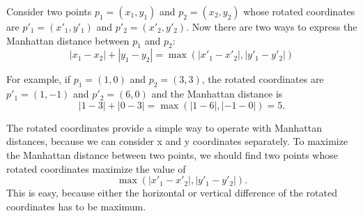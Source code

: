 Consider two points $p_1=(x_1,y_1)$ and $p_2=(x_2,y_2)$ whose rotated
coordinates are $p'_1=(x'_1,y'_1)$ and $p'_2=(x'_2,y'_2)$.
Now there are two ways to express the Manhattan distance
between $p_1$ and $p_2$:
\[|x_1-x_2|+|y_1-y_2| = \max(|x'_1-x'_2|,|y'_1-y'_2|)\]

For example, if $p_1=(1,0)$ and $p_2=(3,3)$,
the rotated coordinates are $p'_1=(1,-1)$ and $p'_2=(6,0)$
and the Manhattan distance is
\[|1-3|+|0-3| = \max(|1-6|,|-1-0|) = 5.\]

The rotated coordinates provide a simple way
to operate with Manhattan distances, because we can
consider x and y coordinates separately.
To maximize the Manhattan distance between two points,
we should find two points whose
rotated coordinates maximize the value of
\[\max(|x'_1-x'_2|,|y'_1-y'_2|).\]
This is easy, because either the horizontal or vertical
difference of the rotated coordinates has to be maximum.
